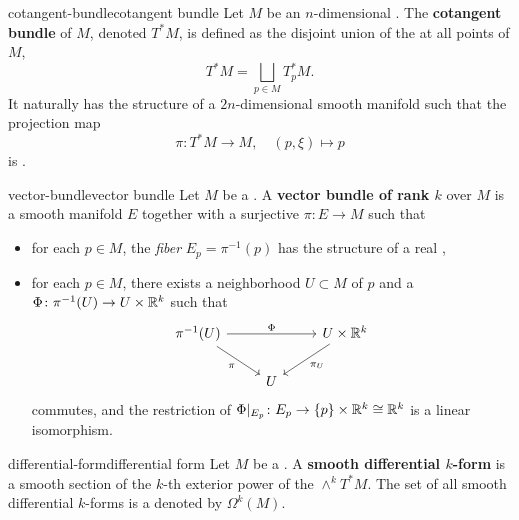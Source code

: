 \begin{topic}{cotangent-bundle}{cotangent bundle}
    Let $M$ be an $n$-dimensional . The \textbf{cotangent bundle} of $M$, denoted $T^*M$, is defined as the disjoint union of the  at all points of $M$,
    \[ T^*M = \bigsqcup_{p \in M} T^*_p M . \]
    It naturally has the structure of a $2n$-dimensional smooth manifold such that the projection map
    \[ \pi \colon T^*M \to M, \quad (p, \xi) \mapsto p \]
    is .
\end{topic}

\begin{topic}{vector-bundle}{vector bundle}
    Let $M$ be a . A \textbf{vector bundle of rank $k$} over $M$ is a smooth manifold $E$ together with a surjective  $\pi \colon E \to M$ such that
    \begin{itemize}
        \item for each $p \in M$, the \textit{fiber} $E_p = \pi^{-1}(p)$ has the structure of a real ,
        \item for each $p \in M$, there exists a neighborhood $U \subset M$ of $p$ and a  $\Phi \colon \pi^{-1}(U) \to U \times \mathbb{R}^k$ such that
        \[ \svg \begin{tikzcd} \pi^{-1}(U) \arrow{rr}{\Phi} \arrow[swap]{dr}{\pi} && U \times \RR^k \arrow{dl}{\pi_U} \\ & U & \end{tikzcd} \]
        commutes, and the restriction of $\Phi|_{E_p} \colon E_p \to \{ p \} \times \mathbb{R}^k \cong \mathbb{R}^k$ is a linear isomorphism.
    \end{itemize}
\end{topic}

\begin{topic}{differential-form}{differential form}
    Let $M$ be a . A \textbf{smooth differential $k$-form} is a smooth section of the $k$-th exterior power of the  $\wedge^k T^* M$. The set of all smooth differential $k$-forms is a  denoted by $\Omega^k(M)$.
\end{topic}

